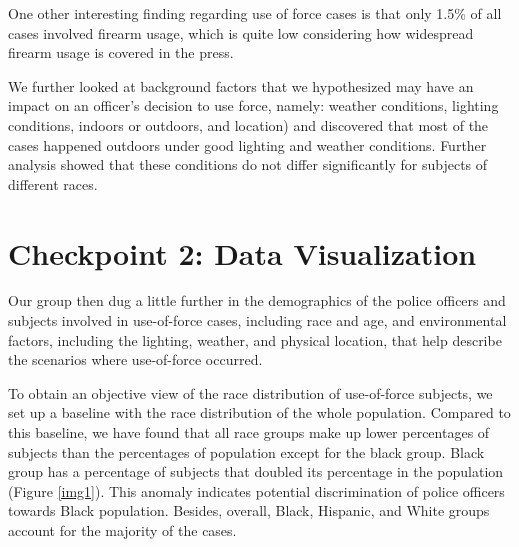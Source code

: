 \documentclass[10pt]{article}
\begin{document}
One other interesting finding regarding use of force cases is that only 1.5\% of all cases involved firearm usage, which is quite low considering how widespread firearm usage is covered in the press.

We further looked at background factors that we hypothesized may have an impact on an officer’s decision to use force, namely: weather conditions, lighting conditions, indoors or outdoors, and location) and discovered that most of the cases happened outdoors under good lighting and weather conditions. Further analysis showed that these conditions do not differ significantly for subjects of different races.



\section*{Checkpoint 2: Data Visualization}

Our group then dug a little further in the demographics of the police officers and subjects involved in use-of-force cases, including race and age, and environmental factors, including the lighting, weather, and physical location, that help describe the scenarios where use-of-force occurred. 

To obtain an objective view of the race distribution of use-of-force subjects, we set up a baseline with the race distribution of the whole population. Compared to this baseline, we have found that all race groups make up lower percentages of subjects than the percentages of population except for the black group. Black group has a percentage of subjects that doubled its percentage in the population (Figure \ref{img1}). This anomaly indicates potential discrimination of police officers towards Black population. Besides, overall, Black, Hispanic, and White groups account for the majority of the cases.
\end{document}
